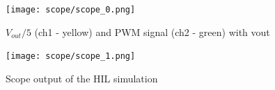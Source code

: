 \begin{figure}[htbp]
    \centering
    \texttt{[image: scope/scope\_0.png]}
    \caption{$V_{out}/5$ (ch1 - yellow) and PWM signal (ch2 - green) with vout }
    \label{fig:scope_output}
\end{figure}

\begin{figure}[htbp]
    \centering
    \texttt{[image: scope/scope\_1.png]}
    \caption{Scope output of the HIL simulation}
    \label{fig:scope_output}
\end{figure}




